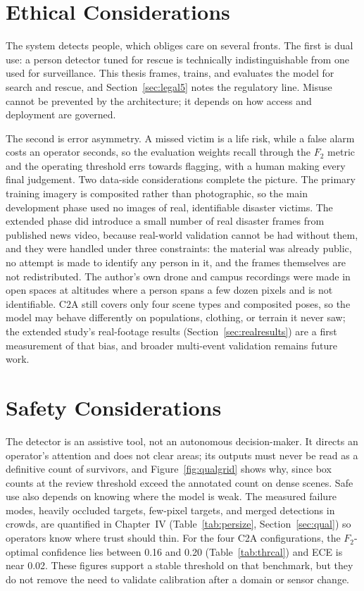\documentclass[12pt,a4paper,oneside]{report}
\begin{document}
\section{Ethical Considerations}
The system detects people, which obliges care on several fronts. The first is
dual use: a person detector tuned for rescue is technically indistinguishable
from one used for surveillance. This thesis frames, trains, and evaluates the
model for search and rescue, and Section~\ref{sec:legal5} notes the
regulatory line. Misuse cannot be prevented by the architecture; it depends on
how access and deployment are governed.

The second is error asymmetry. A missed victim is a life risk, while a false
alarm costs an operator seconds, so the evaluation weights recall through the
$F_2$ metric and the operating threshold errs towards flagging, with a human
making every final judgement. Two data-side considerations complete the
picture. The primary training imagery is composited rather than photographic,
so the main development phase used no images of real, identifiable disaster
victims. The extended phase did introduce a small number of real disaster
frames from published news video, because real-world validation cannot be had
without them, and they were handled under three constraints: the material was
already public, no attempt is made to identify any person in it, and the
frames themselves are not redistributed. The author's own drone and campus
recordings were made in open spaces at altitudes where a person spans a few
dozen pixels and is not identifiable. C2A still covers only four scene types
and composited poses, so the model may behave differently on populations,
clothing, or terrain it never saw; the extended study's real-footage results
(Section~\ref{sec:realresults}) are a first measurement of that bias, and
broader multi-event validation remains future work.

\section{Safety Considerations}
The detector is an assistive tool, not an autonomous decision-maker. It
directs an operator's attention and does not clear areas; its outputs must
never be read as a definitive count of survivors, and
Figure~\ref{fig:qualgrid} shows why, since box counts at the review threshold
exceed the annotated count on dense scenes. Safe use also depends on knowing
where the model is weak. The measured failure modes, heavily occluded
targets, few-pixel targets, and merged detections in crowds, are quantified
in Chapter~IV (Table~\ref{tab:persize}, Section~\ref{sec:qual}) so operators
know where trust should thin. For the four C2A configurations, the
$F_2$-optimal confidence lies between 0.16 and 0.20
(Table~\ref{tab:thrcal}) and ECE is near 0.02. These figures support a stable
threshold on that benchmark, but they do not remove the need to validate
calibration after a domain or sensor change.
\end{document}
